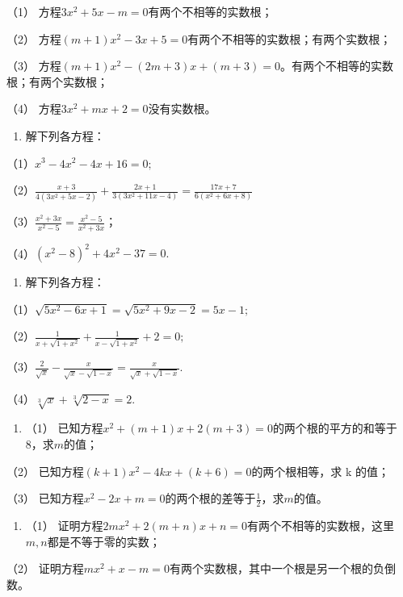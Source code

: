 （1） 方程\(3x^{2}+5x-m=0\)有两个不相等的实数根；

（2） 方程\((m+1)x^{2}-3x+5=0\)有两个不相等的实数根；有两个实数根；

（3）
方程\((m+1)x^{2}-(2m+3)x+(m+3)=0\)。有两个不相等的实数根；有两个实数根；

（4） 方程\(3x^{2} + mx + 2 = 0\)没有实数根。

\begin{enumerate}[start=31]
\item
  解下列各方程：
\end{enumerate}

（1）\(x^{3}-4x^{2}-4x+16=0;\)

（2）\(\frac{x + 3}{4(3x^2 + 5x - 2)} + \frac{2x + 1}{3(3x^2 + 11x - 4)} = \frac{17x + 7}{6(x^2 + 6x + 8)}\)

（3）\(\frac{x^2 + 3x}{x^2 - 5} = \frac{x^2 - 5}{x^2 + 3x}\)；

（4）\((x^{2} - 8)^{2} + 4x^{2} - 37 = 0.\)

\begin{enumerate}[start=32]
\item
  解下列各方程：
\end{enumerate}

（1）\(\sqrt{5x^2 - 6x + 1} = \sqrt{5x^2 + 9x - 2} = 5x - 1;\)

（2）\(\frac{1}{x + \sqrt{1 + x^2}} + \frac{1}{x - \sqrt{1 + x^2}} + 2 = 0;\)

（3）\(\frac{2}{\sqrt{x}} - \frac{x}{\sqrt{x} - \sqrt{1 - x}} = \frac{x}{\sqrt{x} + \sqrt{1 - x}}.\)

（4）\(\sqrt[3]{x} + \sqrt[3]{2 - x} = 2.\)

\begin{enumerate}[start=33]
\item
  （1）
  已知方程\(x^{2} + (m + 1)x + 2(m + 3) = 0\)的两个根的平方的和等于8，求\(m\)的值；
\end{enumerate}

（2） 已知方程\((k+1)x^{2}-4kx+(k+6)=0\)的两个根相等，求 k 的值；

（3）
已知方程\(x^{2} - 2x + m = 0\)的两个根的差等于\(\frac{1}{2}\)，求\(m\)的值。

\begin{enumerate}[start=34]
\item
  （1）
  证明方程\(2mx^{2} + 2(m + n)x + n = 0\)有两个不相等的实数根，这里\(m, n\)都是不等于零的实数；
\end{enumerate}

（2）
证明方程\(mx^2 + x - m = 0\)有两个实数根，其中一个根是另一个根的负倒数。

